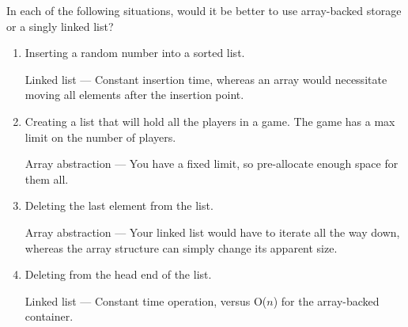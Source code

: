 In each of the following situations, would it be better to use array-backed storage or a singly linked list?
\begin{enumerate}
	\item Inserting a random number into a sorted list.
	\begin{answer}
	Linked list --- Constant insertion time, whereas an array would necessitate moving all elements after the insertion point.
	\end{answer}
	
	\item Creating a list that will hold all the players in a game.  The game has a max limit on the number of players.
	\begin{answer}
	Array abstraction --- You have a fixed limit, so pre-allocate enough space for them all.
	\end{answer}

	\item Deleting the last element from the list.
	\begin{answer}
	Array abstraction --- Your linked list would have to iterate all the way down, whereas the array structure can simply change its apparent size.
	\end{answer}
			
	\item Deleting from the head end of the list.
	\begin{answer}
	Linked list --- Constant time operation, versus O($n$) for the array-backed container.
	\end{answer}
\end{enumerate}  



\vspace{24pt}